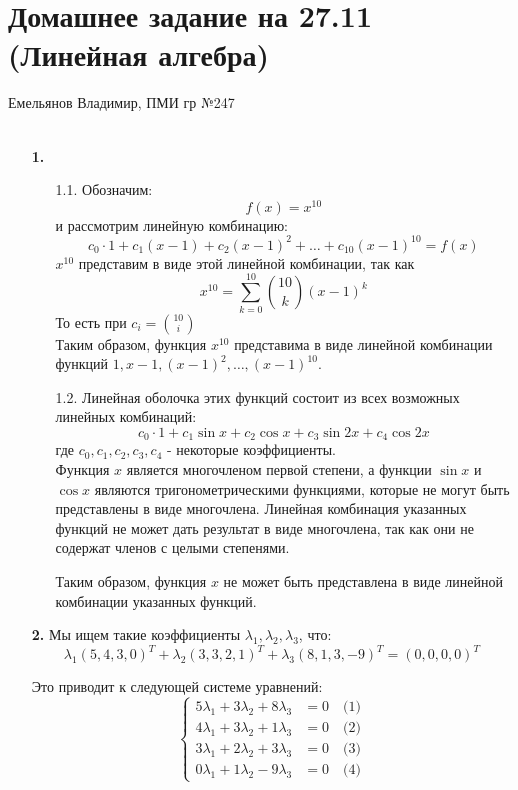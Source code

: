 \documentclass[a4paper]{article}
\newcommand{\case}[1]{\begin{cases} #1 \end{cases}}
\begin{document}
\section*{Домашнее задание на 27.11 (Линейная алгебра)}
 {\large Емельянов Владимир, ПМИ гр №247}\\\\
\begin{enumerate}
    \item[\textbf{1.}]
    \begin{enumerate}
        \item[1.1.] Обозначим:
        $$
        f(x) = x^{10}
        $$
        и рассмотрим линейную комбинацию:
        $$
        c_0 \cdot 1 + c_1 (x-1) + c_2 (x-1)^{2} + \ldots + c_{10} (x-1)^{10} = f(x)
        $$
        $x^{10}$ представим в виде этой линейной комбинации, так как 
        $$x^{10} = \sum_{k=0}^{10} \binom{10}{k} (x-1)^k$$
        То есть при $c_i = \binom{10}{i}$ \\
        Таким образом, функция $ x^{10} $ представима в виде линейной комбинации функций $ 1, x-1, (x-1)^{2}, \ldots, (x-1)^{10} $.
        
        \item[1.2.]
        Линейная оболочка этих функций состоит из всех возможных линейных комбинаций:
        $$
        c_0 \cdot 1 + c_1 \sin x + c_2 \cos x + c_3 \sin 2x + c_4 \cos 2x
        $$
        где $ c_0, c_1, c_2, c_3, c_4 $ - некоторые коэффициенты.\\
        Функция $ x $ является многочленом первой степени, а функции $ \sin x $ и $ \cos x $ являются тригонометрическими функциями, которые не могут быть представлены в виде многочлена. Линейная комбинация указанных функций не может дать результат в виде многочлена, так как они не содержат членов с целыми степенями.
        
        Таким образом, функция $ x $ не может быть представлена в виде линейной комбинации указанных функций.
        
    \end{enumerate}

    \item[\textbf{2.}]
    Мы ищем такие коэффициенты $\lambda_1, \lambda_2, \lambda_3$, что:
    $$
    \lambda_1 (5, 4, 3, 0)^T + \lambda_2 (3, 3, 2, 1)^T + \lambda_3 (8, 1, 3, -9)^T = (0, 0, 0, 0)^T
    $$
    
    Это приводит к следующей системе уравнений:
    $$
    \case{
    5\lambda_1 + 3\lambda_2 + 8\lambda_3 &= 0 \quad \text{(1)} \\
    4\lambda_1 + 3\lambda_2 + 1\lambda_3 &= 0 \quad \text{(2)} \\
    3\lambda_1 + 2\lambda_2 + 3\lambda_3 &= 0 \quad \text{(3)} \\
    0\lambda_1 + 1\lambda_2 - 9\lambda_3 &= 0 \quad \text{(4)}
    }
    $$
    

\end{enumerate}
\end{document}
